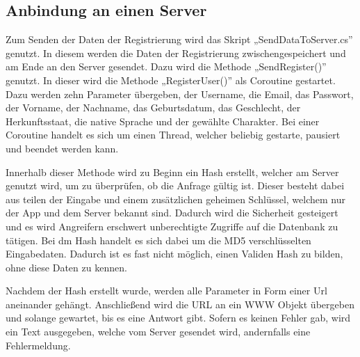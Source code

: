 		\subsection{Anbindung an einen Server}
			Zum Senden der Daten der Registrierung wird das Skript „SendDataToServer.cs” genutzt. In diesem werden die Daten der Registrierung zwischengespeichert und am Ende an den Server gesendet. Dazu wird die Methode „SendRegister()” genutzt. In dieser wird die Methode „RegisterUser()” als Coroutine gestartet. Dazu werden zehn Parameter übergeben, der Username, die Email, das Passwort, der Vorname, der Nachname, das Geburtsdatum, das Geschlecht, der Herkunftsstaat, die native Sprache und der gewählte Charakter. Bei einer Coroutine handelt es sich um einen Thread, welcher beliebig gestarte, pausiert und beendet werden kann.

			Innerhalb dieser Methode wird zu Beginn ein Hash erstellt, welcher am Server genutzt wird, um zu überprüfen, ob die Anfrage gültig ist. Dieser besteht dabei aus teilen der Eingabe und einem zusätzlichen geheimen Schlüssel, welchem nur der App und dem Server bekannt sind. Dadurch wird die Sicherheit gesteigert und es wird Angreifern erschwert unberechtigte Zugriffe auf die Datenbank zu tätigen. Bei dm Hash handelt es sich dabei um die MD5 verschlüsselten Eingabedaten. Dadurch ist es fast nicht möglich, einen Validen Hash zu bilden, ohne diese Daten zu kennen.

			Nachdem der Hash erstellt wurde, werden alle Parameter in Form einer Url aneinander gehängt. Anschließend wird die URL an ein WWW Objekt übergeben und solange gewartet, bis es eine Antwort gibt. Sofern es keinen Fehler gab, wird ein Text ausgegeben, welche vom Server gesendet wird, andernfalls eine Fehlermeldung.

